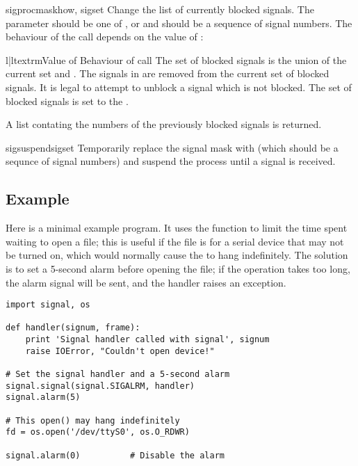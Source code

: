 \begin{funcdesc}{sigprocmask}{how, sigset}
  Change the list of currently blocked signals.  The parameter
   should be one of ,
   or  and 
  should be a sequence of signal numbers.  The behaviour of the call
  depends on the value of :

  \begin{tableii}{l|l}{textrm}{Value of }{Behaviour of call}
	   {The set of blocked signals is the union of the current set
            and .}
           {The signals in  are removed from the current
            set of blocked signals.  It is legal to attempt to unblock 
            a signal which is not blocked.}
	   {The set of blocked signals is set to the .}
  \end{tableii}

  A list contating the numbers of the previously blocked signals is
  returned.
\end{funcdesc}

\begin{funcdesc}{sigsuspend}{sigset}
  Temporarily replace the signal mask with  (which should
  be a sequnce of signal numbers) and suspend the process until a
  signal is received.
\end{funcdesc}

\subsection{Example}

Here is a minimal example program. It uses the 
function to limit the time spent waiting to open a file; this is
useful if the file is for a serial device that may not be turned on,
which would normally cause the  to hang
indefinitely.  The solution is to set a 5-second alarm before opening
the file; if the operation takes too long, the alarm signal will be
sent, and the handler raises an exception.

\begin{verbatim}
import signal, os

def handler(signum, frame):
    print 'Signal handler called with signal', signum
    raise IOError, "Couldn't open device!"

# Set the signal handler and a 5-second alarm
signal.signal(signal.SIGALRM, handler)
signal.alarm(5)

# This open() may hang indefinitely
fd = os.open('/dev/ttyS0', os.O_RDWR)  

signal.alarm(0)          # Disable the alarm
\end{verbatim}
